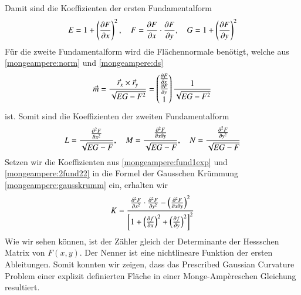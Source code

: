 Damit sind die Koeffizienten der ersten Fundamentalform 
\begin{equation}
  E = 1 + \left(\pdv{F}{x}\right)^2, \quad
  F = \pdv{F}{x} \cdot \pdv{F}{y}, \quad
  G = 1 + \left(\pdv{F}{y}\right)^2
  \label{mongeampere:fund1exp}
\end{equation}
Für die zweite Fundamentalform wird die Flächennormale benötigt, welche aus \eqref{mongeampere:norm} und \eqref{mongeampere:ds} 
\begin{equation}
  \vec m = \frac{\vec r_x \times \vec r_y}{\sqrt{EG-F^2}} = \begin{pmatrix}
    \pdv{F}{x} \\
    \pdv{F}{y} \\
    1
  \end{pmatrix}
  \frac{1}{\sqrt{EG-F^2}}
  \label{mongeampere:norm2}
\end{equation}
ist.
Somit sind die Koeffizienten der zweiten Fundamentalform
\begin{equation}
  L = \frac{\pdv[2]{F}{x}}{\sqrt{EG-F}}, \quad
  M = \frac{\pdv{F}{x}{y}}{\sqrt{EG-F}}, \quad
  N = \frac{\pdv[2]{F}{y}}{\sqrt{EG-F}}
  \label{mongeampere:2fund22}
\end{equation}
Setzen wir die Koeffizienten aus \eqref{mongeampere:fund1exp} und \eqref{mongeampere:2fund22} in die Formel der Gausschen Krümmung \eqref{mongeampere:gausskrumm}
ein, erhalten wir
\begin{equation}
  K = \frac{
    \pdv[2]{F}{x} \cdot \pdv[2]{F}{y} - \left(\pdv{F}{x}{y} \right)^2}
    {\left[1 + 
    \left(\pdv{f}{x}\right)^2 +
    \left(\pdv{f}{y}\right)^2\right]^2}
  \label{mongeampere:pd}
\end{equation}
Wie wir sehen können, ist der Zähler gleich der Determinante der Hessschen Matrix von $F(x,y)$.
Der Nenner ist eine nichtlineare Funktion der ersten Ableitungen.
Somit konnten wir zeigen, dass das Prescribed Gaussian Curvature Problem einer explizit definierten Fläche in einer 
Monge-Ampèreschen Gleichung resultiert.

